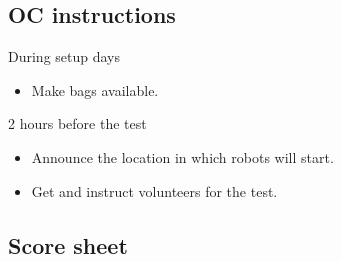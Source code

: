 \subsection{OC instructions}

During setup days
\begin{itemize}
  \item Make bags available.
\end{itemize}

2 hours before the test
\begin{itemize}
  \item Announce the location in which robots will start.
  \item Get and instruct volunteers for the test.
\end{itemize}

\newpage
\subsection{Score sheet}

